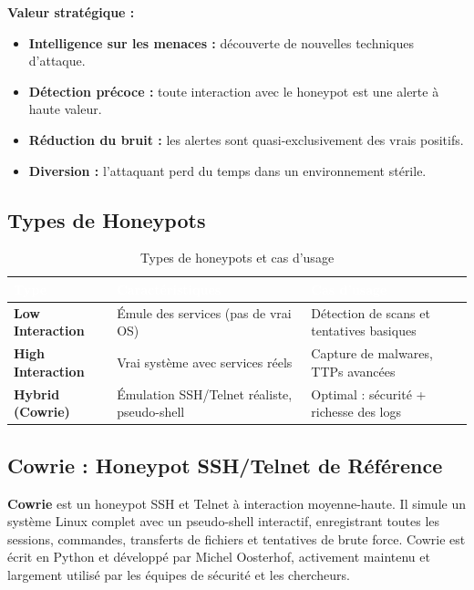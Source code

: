 \documentclass[12pt,a4paper,openany]{report}
\begin{document}
\textbf{Valeur stratégique :}
\begin{itemize}
    \item \textbf{Intelligence sur les menaces :} découverte de nouvelles techniques d'attaque.
    \item \textbf{Détection précoce :} toute interaction avec le honeypot est une alerte à haute valeur.
    \item \textbf{Réduction du bruit :} les alertes sont quasi-exclusivement des vrais positifs.
    \item \textbf{Diversion :} l'attaquant perd du temps dans un environnement stérile.
\end{itemize}

\subsection{Types de Honeypots}

\begin{table}[H]
    \centering
    \renewcommand{\arraystretch}{1.8}
    \setlength{\tabcolsep}{10pt}
    \setlength{\arrayrulewidth}{0.8pt}
    \begin{tabularx}{\textwidth}{|>{\bfseries}p{3.5cm}|X|X|}
        \arrayrulecolor{tableborder}
        \hline
        \rowcolor{tableheadbg}
        \textcolor{white}{\textbf{Type}} &
        \textcolor{white}{\textbf{Caractéristiques}} &
        \textcolor{white}{\textbf{Cas d'usage}} \\
        \hline
        \rowcolor{tablerowalt}
        Low Interaction & Émule des services (pas de vrai OS) & Détection de scans et tentatives basiques \\
        \hline
        High Interaction & Vrai système avec services réels & Capture de malwares, TTPs avancées \\
        \hline
        \rowcolor{tablerowalt}
        Hybrid (Cowrie) & Émulation SSH/Telnet réaliste, pseudo-shell & Optimal : sécurité + richesse des logs \\
        \hline
    \end{tabularx}
    \caption{Types de honeypots et cas d'usage}
    \label{tab:honeypot-types}
\end{table}

\subsection{Cowrie : Honeypot SSH/Telnet de Référence}

\textbf{Cowrie} est un honeypot SSH et Telnet à interaction moyenne-haute. Il simule un système
Linux complet avec un pseudo-shell interactif, enregistrant toutes les sessions, commandes,
transferts de fichiers et tentatives de brute force. Cowrie est écrit en Python et développé par
Michel Oosterhof, activement maintenu et largement utilisé par les équipes de sécurité et les
chercheurs.
\end{document}
